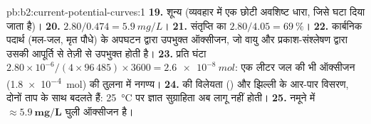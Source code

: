 \begin{solution}{pb:b2:current-potential-curves:1}
\textbf{19.} शून्य (व्यवहार में एक छोटी अवशिष्ट धारा, जिसे घटा दिया जाता है)।
\textbf{20.} $2.80/0.474 = \qty{5.9}{mg/L}$।
\textbf{21.} संतृप्ति का $2.80/4.05 = 69~\%$।
\textbf{22.} कार्बनिक पदार्थ (मल-जल, मृत पौधे) के अपघटन द्वारा उपभुक्त ऑक्सीजन,
जो वायु और प्रकाश-संश्लेषण द्वारा उसकी आपूर्ति से तेज़ी से उपभुक्त होती है।
\textbf{23.} प्रति घंटा $2.80 \times 10^{-6}/(4 \times 96\,485) \times 3600 = \qty{2.6e-8}{mol}$:
एक लीटर जल की भी ऑक्सीजन (\qty{1.8e-4}{mol}) की तुलना में
नगण्य।
\textbf{24.}  की विलेयता () और झिल्ली के आर-पार
विसरण, दोनों ताप के साथ बदलते हैं: \qty{25}{\degreeCelsius} पर ज्ञात
सुग्राहिता अब लागू नहीं होती।
\textbf{25.} नमूने में $\boldsymbol{\approx \qty{5.9}{mg/L}}$ घुली
ऑक्सीजन है।
\end{solution}
